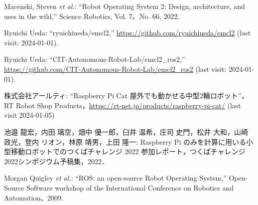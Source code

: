 \documentclass[twocolumn,9pt]{jsproceedings}
\begin{document}
\footnotesize
\begin{thebibliography}{99}

  Macenski, Steven {\it et al.}: ``Robot Operating System 2: Design, architecture, and uses in the wild,''
  Science Robotics, Vol. 7、No. 66, 2022.

  Ryuichi Ueda: ``ryuichiueda/emcl2,'' \url{https://github.com/ryuichiueda/emcl2} (last visit: 2024-01-01).

  Ryuichi Ueda: ``CIT-Autonomous-Robot-Lab/emcl2\_ros2,'' \url{https://github.com/CIT-Autonomous-Robot-Lab/emcl2_ros2} (last visit: 2024-01-01).


  株式会社アールティ: ``Raspberry Pi Cat 屋外でも動かせる中型2輪ロボット''，
  RT Robot Shop Products，\url{https://rt-net.jp/products/raspberry-pi-cat/} (last visit 2024-01-05)

  池邉 龍宏，内田 璃空，畑中 優一郎，臼井 温希，庄司 史門，松井 大和，山崎 政光，登内 リオン，林原 靖男，上田 隆一: Raspberry Pi のみを計算に用いる小型移動ロボットでのつくばチャレンジ 2022 参加レポート，つくばチャレンジ2022シンポジウム予稿集，2022．

  Morgan Quigley {\it et al.}: ``ROS: an open-source Robot Operating System,''
  Open-Source Software workshop of the International Conference on Robotics and Automation、2009.







\end{thebibliography}
\end{document}
